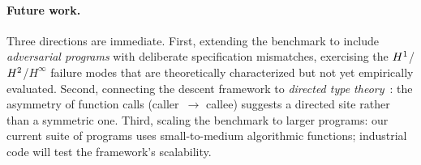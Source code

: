 \documentclass[11pt]{article}
\begin{document}
\paragraph{Future work.}
Three directions are immediate.  First, extending the benchmark to include
\emph{adversarial programs} with deliberate specification mismatches,
exercising the $H^{1}$/$H^{2}$/$H^{\infty}$ failure modes that are
theoretically characterized but not yet empirically evaluated.
Second, connecting the descent framework to \emph{directed
type theory}~\cite{riehl2017}: the asymmetry of function calls
(caller~$\to$ callee) suggests a directed site rather than a symmetric one.
Third, scaling the benchmark to larger programs: our current suite of
\compTotalPrograms{} programs uses small-to-medium algorithmic functions;
industrial code will test the framework's scalability.
\end{document}
